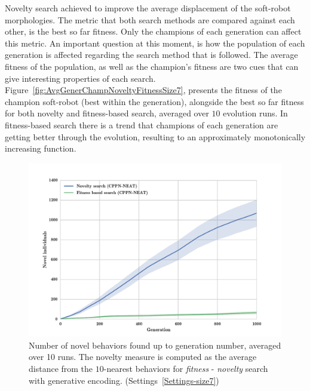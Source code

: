 Novelty search achieved to improve the average displacement of the soft-robot morphologies. The metric that both search methods are compared against each other, is the best so far fitness. Only the champions of each generation can affect this metric. An important question at this moment, is how the population of each generation is affected regarding the search method that is followed. The average fitness of the population, as well as the champion's fitness are two cues that can give interesting properties of each search. Figure~\ref{fig:AvgGenerChampNoveltyFitnessSize7}, presents the fitness of the champion soft-robot (best within the generation), alongside the best so far fitness for both novelty and fitness-based search, averaged over $10$ evolution runs. In fitness-based search there is a trend that champions of each generation are getting better through the evolution, resulting to an approximately monotonically increasing function. 
\begin{figure}[t!]
\centering
\includegraphics[width=1.0\textwidth]{../Figures/Results/novelIndividualsFitNovComp.pdf}
\caption{Number of novel behaviors found up to generation number, averaged over 10 runs. The novelty measure is computed as the average distance from the $10$-nearest behaviors for \emph{fitness} - \emph{novelty} search with generative encoding. (Settings~\ref{Settings-size7})}
\label{fig:novelIndividualsFitNovComp}
\end{figure}
